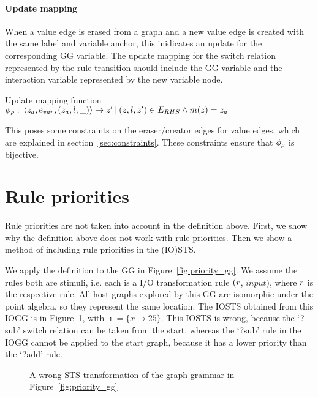\paragraph*{Update mapping}\label{sec:updates}
When a value edge is erased from a graph and a new value edge is created with the same label and variable anchor, this inidicates an update for the corresponding GG variable. The update mapping for the switch relation represented by the rule transition should include the GG variable and the interaction variable represented by the new variable node.
\vspace{10px}\begin{definition} Update mapping function
\vspace{2px} \\
$\phi_{\rho}:\: \langle z_a, e_{var}, (z_a, l, \_)\rangle \mapsto z'\: |\: (z, l, z') \in E_{RHS} \land m(z) = z_a$
\end{definition}
\vspace{10px}
This poses some constraints on the eraser/creator edges for value edges, which are explained in section~\ref{sec:constraints}. These constraints ensure that $\phi_{\rho}$ is bijective.

\section{Rule priorities}
Rule priorities are not taken into account in the definition above. First, we show why the definition above does not work with rule priorities. Then we show a method of including rule priorities in the (IO)STS.

We apply the definition to the GG in Figure~\ref{fig:priority_gg}. We assume the rules both are stimuli, i.e. each is a I/O transformation rule $(r$, $\mathit{input})$, where $r$ is the respective rule. All host graphs explored by this GG are isomorphic under the point algebra, so they represent the same location. The IOSTS obtained from this IOGG is in Figure~\ref{fig:priority_sts_wrong}, with $\imath = \{x \mapsto 25\}$. This IOSTS is wrong, because the `?sub' switch relation can be taken from the start, whereas the `?sub' rule in the IOGG cannot be applied to the start graph, because it has a lower priority than the `?add' rule.

\begin{figure}[ht]
  \begin{center}
    
  \end{center}
  \caption{A wrong STS transformation of the graph grammar in Figure~\ref{fig:priority_gg}}
  \label{fig:priority_sts_wrong}
\end{figure}

